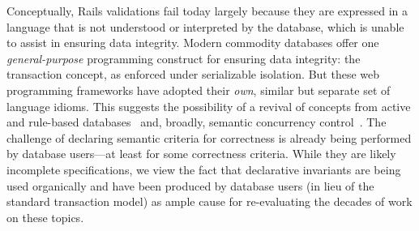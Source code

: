 Conceptually, Rails validations fail today largely because they are
expressed in a language that is not understood or interpreted by the
database, which is unable to assist in ensuring data integrity. Modern
commodity databases offer one \textit{general-purpose} programming
construct for ensuring data integrity: the transaction concept, as
enforced under serializable isolation. But these web programming
frameworks have adopted their \textit{own}, similar but separate set
of language idioms. This suggests the possibility of a revival of concepts from
 active and rule-based databases~\cite{activedb-book} and, broadly,
 semantic concurrency control~\cite{tamer-book}. The challenge of
 declaring semantic criteria for correctness is already being performed
 by database users---at least for some correctness criteria. While they
 are likely incomplete specifications, we view the fact that
 declarative invariants are being used organically and have been
 produced by database users (in lieu of the standard transaction model) as
 ample cause for re-evaluating the decades of work on these topics.





